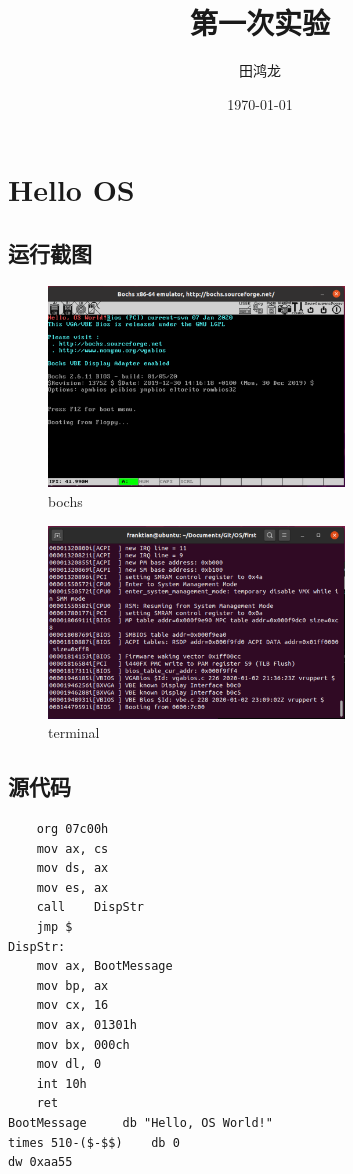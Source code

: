 \documentclass{article}
\title{第一次实验}
\author{田鸿龙}
\date{\today}
\begin{document}
\maketitle
\section{Hello OS}
\subsection{运行截图}
\begin{figure}[H]
    \centering
    \includegraphics[width=0.7\textwidth]{bochs}
    \caption{bochs}
\end{figure}
\begin{figure}[H]
    \centering
    \includegraphics[width=0.7\textwidth]{terminal}
    \caption{terminal}
\end{figure}
\subsection{源代码}
\begin{lstlisting}
    org 07c00h
	mov ax, cs
	mov ds, ax
	mov es, ax
	call	DispStr
	jmp $
DispStr:
	mov ax, BootMessage
	mov bp, ax
	mov cx, 16
	mov ax, 01301h
	mov bx, 000ch
	mov dl, 0
	int 10h
	ret
BootMessage		db "Hello, OS World!"
times 510-($-$$)	db 0
dw 0xaa55
\end{lstlisting}
\end{document}
